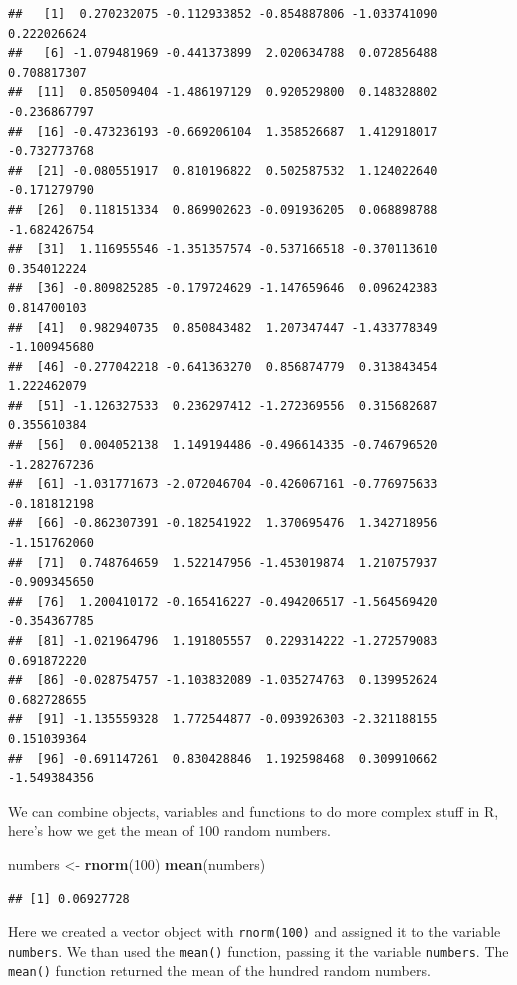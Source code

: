 \documentclass[
]{book}
\newenvironment{Shaded}{\begin{snugshade}}{\end{snugshade}}
\newcommand{\DecValTok}[1]{\textcolor[rgb]{0.00,0.00,0.81}{#1}}
\newcommand{\KeywordTok}[1]{\textcolor[rgb]{0.13,0.29,0.53}{\textbf{#1}}}
\newcommand{\NormalTok}[1]{#1}
\newcommand{\StringTok}[1]{\textcolor[rgb]{0.31,0.60,0.02}{#1}}
\begin{document}
\begin{verbatim}
##   [1]  0.270232075 -0.112933852 -0.854887806 -1.033741090  0.222026624
##   [6] -1.079481969 -0.441373899  2.020634788  0.072856488  0.708817307
##  [11]  0.850509404 -1.486197129  0.920529800  0.148328802 -0.236867797
##  [16] -0.473236193 -0.669206104  1.358526687  1.412918017 -0.732773768
##  [21] -0.080551917  0.810196822  0.502587532  1.124022640 -0.171279790
##  [26]  0.118151334  0.869902623 -0.091936205  0.068898788 -1.682426754
##  [31]  1.116955546 -1.351357574 -0.537166518 -0.370113610  0.354012224
##  [36] -0.809825285 -0.179724629 -1.147659646  0.096242383  0.814700103
##  [41]  0.982940735  0.850843482  1.207347447 -1.433778349 -1.100945680
##  [46] -0.277042218 -0.641363270  0.856874779  0.313843454  1.222462079
##  [51] -1.126327533  0.236297412 -1.272369556  0.315682687  0.355610384
##  [56]  0.004052138  1.149194486 -0.496614335 -0.746796520 -1.282767236
##  [61] -1.031771673 -2.072046704 -0.426067161 -0.776975633 -0.181812198
##  [66] -0.862307391 -0.182541922  1.370695476  1.342718956 -1.151762060
##  [71]  0.748764659  1.522147956 -1.453019874  1.210757937 -0.909345650
##  [76]  1.200410172 -0.165416227 -0.494206517 -1.564569420 -0.354367785
##  [81] -1.021964796  1.191805557  0.229314222 -1.272579083  0.691872220
##  [86] -0.028754757 -1.103832089 -1.035274763  0.139952624  0.682728655
##  [91] -1.135559328  1.772544877 -0.093926303 -2.321188155  0.151039364
##  [96] -0.691147261  0.830428846  1.192598468  0.309910662 -1.549384356
\end{verbatim}

We can combine objects, variables and functions to do more complex stuff in R, here's how we get the mean of 100 random numbers.

\begin{Shaded}
\begin{Highlighting}[]
\NormalTok{numbers <-}\StringTok{ }\KeywordTok{rnorm}\NormalTok{(}\DecValTok{100}\NormalTok{)}
\KeywordTok{mean}\NormalTok{(numbers)}
\end{Highlighting}
\end{Shaded}

\begin{verbatim}
## [1] 0.06927728
\end{verbatim}

Here we created a vector object with \texttt{rnorm(100)} and assigned it to the variable \texttt{numbers}. We than used the \texttt{mean()} function, passing it the variable \texttt{numbers}. The \texttt{mean()} function returned the mean of the hundred random numbers.
\end{document}
